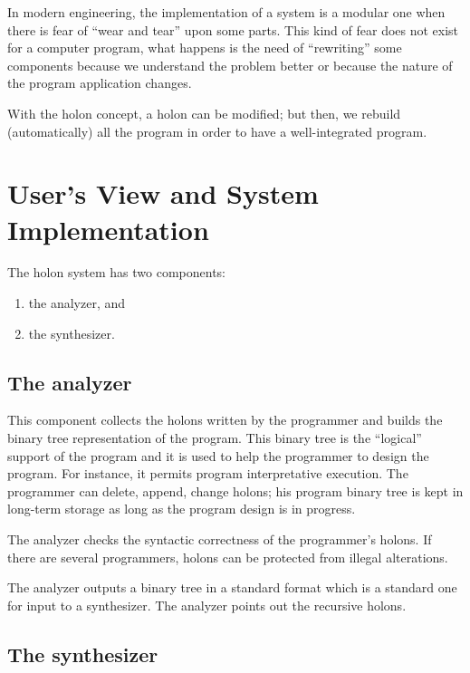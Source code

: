 \documentclass[openany,nobib]{tufte-book}
\begin{document}
In modern engineering, the implementation of a system is a modular one when
there is fear of ``wear and tear'' upon some parts. This kind of fear does not
exist for a computer program, what happens is the need of ``rewriting'' some
components because we understand the problem better or because the nature of
the program application changes.

With the holon concept, a holon can be modified; but then, we rebuild
(automatically) all the program in order to have a well-integrated program.

\bigskip


\chapter{User's View and System Implementation}

The holon system has two components:
\begin{enumerate}
    \item the analyzer, and
    \item the synthesizer.
\end{enumerate}

\section{The analyzer}

\noindent This component collects the holons written by the programmer and
builds the binary tree representation of the program. This binary tree is the
``logical'' support of the program and it is used to help the programmer to
design the program. For instance, it permits program interpretative execution.
The programmer can delete, append, change holons; his program binary tree is
kept in long-term storage as long as the program design is in progress.

The analyzer checks the syntactic correctness of the programmer's holons.
If there are several programmers, holons can be protected from illegal
alterations.

The analyzer outputs a binary tree in a standard format which is a standard one
for input to a synthesizer. The analyzer points out the recursive holons.

\section{The synthesizer}
\end{document}
